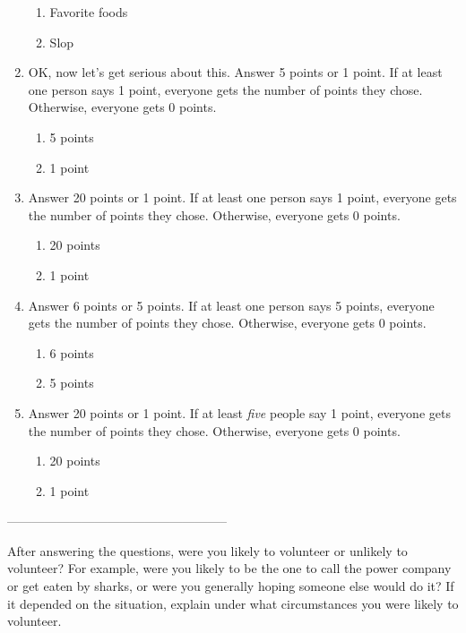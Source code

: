\begin{enumerate}
\begin{enumerate}
\item Favorite foods
\item Slop
\end{enumerate}

\item OK, now let's get serious about this. Answer 5 points or 1 point. If at least one person says 1 point, everyone gets the number of points they chose. Otherwise, everyone gets 0 points.

\begin{enumerate}
\item 5 points
\item 1 point
\end{enumerate}

\item Answer 20 points or 1 point. If at least one person says 1 point, everyone gets the number of points they chose. Otherwise, everyone gets 0 points.

\begin{enumerate}
\item 20 points
\item 1 point
\end{enumerate}

\item Answer 6 points or 5 points. If at least one person says 5 points, everyone gets the number of points they chose. Otherwise, everyone gets 0 points.

\begin{enumerate}
\item 6 points
\item 5 points
\end{enumerate}

\item Answer 20 points or 1 point. If at least \emph{five}  people say 1 point, everyone gets the number of points they chose. Otherwise, everyone gets 0 points.

\begin{enumerate}
\item 20 points
\item 1 point
\end{enumerate}
\end{enumerate}
-----------------------------------------------------


\begin{xca} After answering the questions, were you likely to volunteer or unlikely to volunteer? For example, were you likely to be the one to call the power company or get eaten by sharks, or were you generally hoping someone else would do it? If it depended on the situation, explain under what circumstances you were likely to volunteer.
\end{xca}

